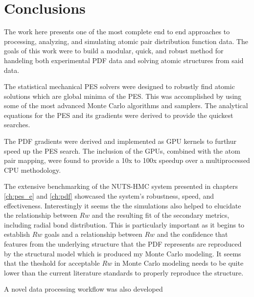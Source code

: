 \chapter*{Conclusions}
The work here presents one of the most complete end to end approaches to processing, analyzing, and simulating atomic pair distribution function data.
The goals of this work were to build a modular, quick, and robust method for handeling both experimental PDF data and solving atomic structures from said data.

The statistical mechanical PES solvers were designed to robustly find atomic solutions which are global minima of the PES.
This was accomplished by using some of the most advanced Monte Carlo algorithms and samplers.
The analytical equations for the PES and its gradients were derived to provide the quickest searches.

The PDF gradients were derived and implemented as GPU kernels to furthur speed up the PES search.
The inclusion of the GPUs, combined with the atom pair mapping, were found to provide a 10x to 100x speedup over a multiprocessed CPU methodology.

The extensive benchmarking of the NUTS-HMC system presented in chapters \ref{ch:pes_e} and \ref{ch:pdf} showcased the system's robustness, speed, and effectiveness.
Interestingly it seems the the simulations also helped to elucidate the relationship between $Rw$ and the resulting fit of the secondary metrics, including radial bond distribution.
This is particularly important as it begins to establish $Rw$ goals and a relationship between $Rw$ and the confidence that features from the underlying structure that the PDF represents are reproduced by the structural model which is produced my Monte Carlo modeling.
It seems that the theshold for acceptable $Rw$ in Monte Carlo modeling needs to be quite lower than the current literature standards to properly reproduce the structure.

A novel data processing workflow was also developed